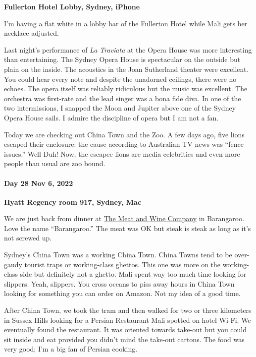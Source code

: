 \textbf{Fullerton Hotel Lobby, Sydney, iPhone}

I'm having a flat white in a lobby bar of the Fullerton Hotel while Mali
gets her necklace adjusted.

Last night's performance of \emph{La Traviata} at the Opera House was
more interesting than entertaining. The Sydney Opera House is
spectacular on the outside but plain on the inside. The acoustics in the
Joan Sutherland theater were excellent. You could hear every note and
despite the unadorned ceilings, there were no echoes. The opera itself
was reliably ridiculous but the music was excellent. The orchestra was
first-rate and the lead singer was a bona fide diva. In one of the two
intermissions, I snapped the Moon and Jupiter above one of the Sydney
Opera House sails. I admire the discipline of opera but I am not a fan.

Today we are checking out China Town and the Zoo. A few days ago, five
lions escaped their enclosure: the cause according to Australian TV news
was ``fence issues.'' Well Duh! Now, the escapee lions are media
celebrities and even more people than usual are zoo bound.

\hypertarget{day-28-nov-6-2022-hyatt-regency-room-917-sydney-mac}{%
\paragraph{\texorpdfstring{\textbf{Day 28 Nov 6, 2022}}{Day 28 Nov 6, 2022}}\label{day-28-nov-6-2022-hyatt-regency-room-917-sydney-mac}}

\textbf{Hyatt Regency room 917, Sydney, Mac}

We are just back from dinner at
\href{https://themeatandwineco.com/sydney-restaurants/barangaroo/}{The
Meat and Wine Company} in Barangaroo. Love the name ``Barangaroo.'' The
meat was OK but steak is steak as long as it's not screwed up.

Sydney's China Town was a working China Town. China Towns tend to be
over-gaudy tourist traps or working-class ghettos. This one was more on
the working-class side but definitely not a ghetto. Mali spent way too
much time looking for slippers. Yeah, slippers. You cross oceans to piss
away hours in China Town looking for something you can order on Amazon.
Not my idea of a good time.

After China Town, we took the tram and then walked for two or three
kilometers in Sussex Hills looking for a Persian Restaurant Mali spotted
on hotel Wi-Fi. We eventually found the restaurant. It was oriented
towards take-out but you could sit inside and eat provided you didn't
mind the take-out cartons. The food was very good; I'm a big fan of
Persian cooking.

